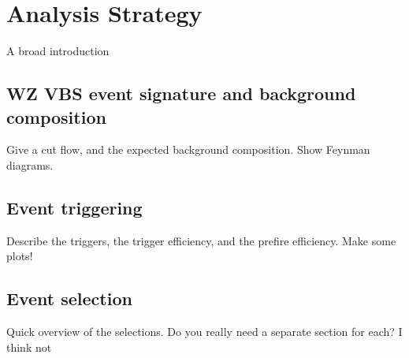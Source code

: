 \chapter{Analysis Strategy}
A broad introduction
\section{WZ VBS event signature and background composition}
Give a cut flow, and the expected background composition. Show Feynman diagrams.
\section{Event triggering}
Describe the triggers, the trigger efficiency, and the prefire efficiency. Make some plots!
\section{Event selection}

Quick overview of the selections. Do you really need a separate section for each? I think not

